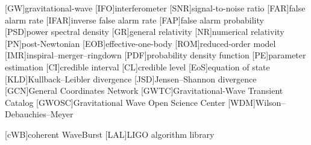 [GW]{gravitational-wave\protect{}}
[IFO]{interferometer}
[SNR]{signal-to-noise ratio}
[FAR]{false alarm rate}
[IFAR]{inverse false alarm rate}
[FAP]{false alarm probability}
[PSD]{power spectral density}
[GR]{general relativity}
[NR]{numerical relativity}
[PN]{post-Newtonian}
[EOB]{effective-one-body}
[ROM]{reduced-order model}
[IMR]{inspiral--merger--ringdown}
[PDF]{probability density function}
[PE]{parameter estimation}
[CI]{credible interval}
[CL]{credible level}
[EoS]{equation of state}
[KLD]{Kullback--Leibler divergence}
[JSD]{Jensen--Shannon divergence}
[GCN]{General Coordinates Network}
[GWTC]{Gravitational-Wave Transient Catalog}
[GWOSC]{Gravitational Wave Open Science Center}
[WDM]{Wilson--Debauchies--Meyer}

[cWB]{coherent WaveBurst}
[LAL]{\ac{LIGO} algorithm library}


